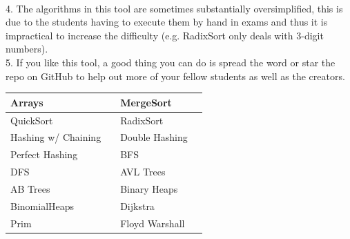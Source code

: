 \documentclass[12pt]{article}
\begin{document}
    \\[0.2in]
    4. The algorithms in this tool are sometimes substantially oversimplified, this is due to the students having to execute them by hand in exams
    and thus it is impractical to increase the difficulty (e.g. RadixSort only deals with 3-digit numbers).
    \\[0.2in]
    5. If you like this tool, a good thing you can do is spread the word or star the repo on GitHub to help out more of your fellow students as well as the creators.
    \vspace{20px}
    \begin{center}
        \begin{tabular}{|P{3cm}|P{1cm}|P{3cm}|P{1cm}|}
            \hline
            Arrays & %
            & MergeSort & %
            \\ \hline
            QuickSort & %
            & RadixSort & %
            \\ \hline
            Hashing w/ Chaining & %
            & Double Hashing & %
            \\ \hline
            Perfect Hashing & %
            & BFS & %
            \\ \hline
            DFS & %
            & AVL Trees & %
            \\ \hline
            AB Trees & %
            & Binary Heaps & %
            \\ \hline
            BinomialHeaps & %
            & Dijkstra & %
            \\ \hline
            Prim & %
            & Floyd Warshall & %
            \\ \hline
        \end{tabular}
    \end{center}
\end{document}
